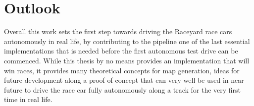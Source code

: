 \section{Outlook}
Overall this work sets the first step towards driving the Raceyard race cars autonomously in real life, by contributing to the pipeline one of the last essential implementations that is needed before the first autonomous test drive can be commenced. While this thesis by no means provides an implementation that will win races, it provides many theoretical concepts for map generation, ideas for future development along a proof of concept that can very well be used in near future to drive the race car fully autonomously along a track for the very first time in real life.